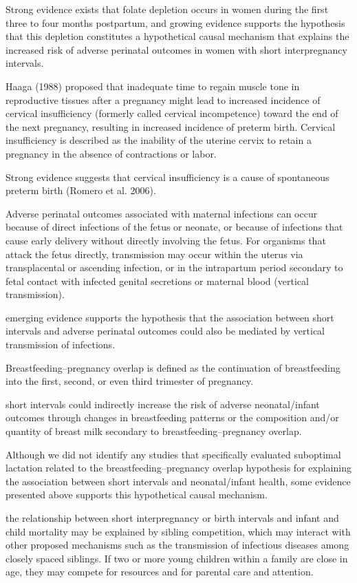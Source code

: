 Strong evidence exists that folate depletion occurs in women during the
first three to four months postpartum, and growing evidence supports the
hypothesis that this depletion constitutes a hypothetical causal
mechanism that explains the increased risk of adverse perinatal outcomes
in women with short interpregnancy intervals.

Haaga (1988) proposed that inadequate time to regain muscle tone in
reproductive tissues after a pregnancy might lead to increased incidence
of cervical insufficiency (formerly called cervical incompetence) toward
the end of the next pregnancy, resulting in increased incidence of
preterm birth. Cervical insufficiency is described as the inability of
the uterine cervix to retain a pregnancy in the absence of contractions
or labor.

Strong evidence suggests that cervical insufficiency is a cause of
spontaneous preterm birth (Romero et al. 2006).

Adverse perinatal outcomes associated with maternal infections can occur
because of direct infections of the fetus or neonate, or because of
infections that cause early delivery without directly involving the
fetus. For organisms that attack the fetus directly, transmission may
occur within the uterus via transplacental or ascending infection, or in
the intrapartum period secondary to fetal contact with infected genital
secretions or maternal blood (vertical transmission).

emerging evidence supports the hypothesis that the association between
short intervals and adverse perinatal outcomes could also be mediated by
vertical transmission of infections.

Breastfeeding–pregnancy overlap is defined as the continuation of
breastfeeding into the first, second, or even third trimester of
pregnancy.

short intervals could indirectly increase the risk of adverse
neonatal/infant outcomes through changes in breastfeeding patterns or
the composition and/or quantity of breast milk secondary to
breastfeeding–pregnancy overlap.

Although we did not identify any studies that specifically evaluated
suboptimal lactation related to the breastfeeding–pregnancy overlap
hypothesis for explaining the association between short intervals and
neonatal/infant health, some evidence presented above supports this
hypothetical causal mechanism.

the relationship between short interpregnancy or birth intervals and
infant and child mortality may be explained by sibling competition,
which may interact with other proposed mechanisms such as the
transmission of infectious diseases among closely spaced siblings. If
two or more young children within a family are close in age, they may
compete for resources and for parental care and attention.

